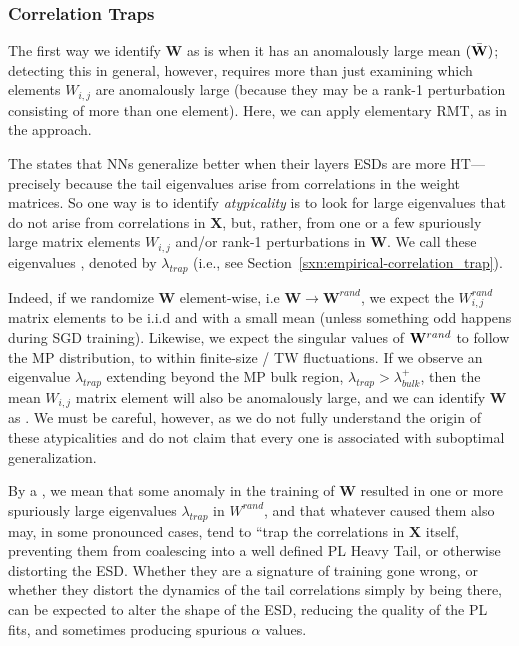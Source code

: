 \subsubsection{Correlation Traps}
\label{sxn:Traps}

The first way we identify $\mathbf{W}$ as \ATypical is when it has an anomalously large mean $(\bar{{\mathbf{W}}})$;
detecting this in general, however, requires more than just examining which elements $W_{i,j}$ are
anomalously large (because they may be a rank-1 perturbation consisting of more than one element).  Here, we can apply elementary RMT, as in the \HTSR approach.

The \HTSR \Phenomenology states that NNs generalize better when their layers ESDs are more HT---precisely because the 
tail eigenvalues arise from correlations in the weight matrices.
So one way is to identify \emph{atypicality} is to look for  large eigenvalues that
do not arise from correlations in $\mathbf{X}$,
but, rather, from one or a few spuriously large matrix elements $W_{i,j}$ and/or rank-1 perturbations in $\mathbf{W}$.
We call these eigenvalues  \CorrelationTraps, denoted by $\lambda_{trap}$
(i.e., see Section~\ref{sxn:empirical-correlation_trap}).

Indeed, if we randomize $\mathbf{W}$ element-wise, i.e $\mathbf{W}\rightarrow\mathbf{W}^{rand}$, we
expect the $W^{rand}_{i,j}$ matrix elements to be i.i.d and with a small mean
(unless something odd happens during SGD training).
Likewise, we expect the singular values of ${\mathbf{W}}^{rand}$ to follow the MP distribution, to within
finite-size / TW fluctuations.
If we observe an eigenvalue $\lambda_{trap}$ extending beyond the MP bulk region, $\lambda_{trap}>\lambda^{+}_{bulk}$,
then the mean $W_{i,j}$ matrix element will also be anomalously large,
and we can identify $\mathbf{W}$ as \ATypical.
We must be careful, however, as we do not fully understand the origin of these atypicalities
and do not claim that every one is associated with suboptimal generalization.

By a \emph{\CorrelationTrap}, we mean that some anomaly in the training of $\mathbf{W}$ resulted
in one or more spuriously large eigenvalues $\lambda_{trap}$ in $W^{rand}$,
and that  whatever caused them also may, in some pronounced cases, tend
to ``trap the correlations in $\mathbf{X}$ itself,
preventing them from coalescing into a well defined PL Heavy Tail,
or otherwise distorting the ESD.
Whether they are a signature of training gone wrong, or whether they distort the dynamics of the tail correlations 
simply by being there, \CorrelationTraps can be expected to alter the shape of the ESD,
reducing the quality of the PL fits, and sometimes producing spurious $\alpha$ values.


